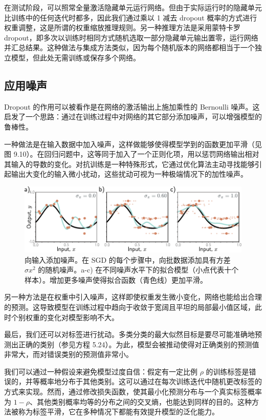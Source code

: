 \documentclass[lang=cn,newtx,10pt,scheme=chinese]{elegantbook}
\begin{document}
在测试阶段，可以照常全量激活隐藏单元运行网络。但由于实际运行时的隐藏单元比训练中的任何迭代时都多，因此我们通过乘以 1 减去 dropout 概率的方式进行权重调整，这是所谓的权重缩放推理规则。另一种推理方法是采用蒙特卡罗 dropout，即多次以训练时相同方式随机选取一部分隐藏单元输出置零，运行网络并汇总结果。这种做法与集成方法类似，因为每个随机版本的网络都相当于一个独立模型，但此处无需训练或保存多个网络。
\subsection{应用噪声}
Dropout 的作用可以被看作是在网络的激活输出上施加乘性的 Bernoulli 噪声。这启发了一个思路：通过在训练过程中对网络的其它部分添加噪声，可以增强模型的鲁棒性。

一种做法是在输入数据中加入噪声，这样做能够使得模型学到的函数更加平滑（见图 9.10）。在回归问题中，这等同于加入了一个正则化项，用以惩罚网络输出相对其输入的导数的变化。对抗训练是一种特殊形式，它通过优化算法主动寻找能够引起输出大变化的输入微小扰动，这些扰动可视为一种极端情况下的加性噪声。

\begin{figure}[ht!]
	\centering
	\includegraphics[width=0.7\linewidth]{PDFFigures/UDLChap9PDF/RegNoise.pdf}
	\caption{向输入添加噪声。在 SGD 的每个步骤中，向批数据添加具有方差 \(\sigma x^2\) 的随机噪声。a-c) 在不同噪声水平下的拟合模型（小点代表十个样本）。增加更多噪声使得拟合函数（青色线）更加平滑。}
\end{figure}


另一种方法是在权重中引入噪声，这样即使权重发生微小变化，网络也能给出合理的预测。这导致模型在训练过程中趋向于收敛于宽阔且平坦的局部最小值区域，此时个别权重的变化对模型影响不大。

最后，我们还可以对标签进行扰动。多类分类的最大似然目标是要尽可能准确地预测出正确的类别（参见方程 5.24）。为此，模型会被推动使得对正确类别的预测值非常大，而对错误类别的预测值非常小。

我们可以通过一种假设来避免模型过度自信：假定有一定比例 \(\rho\) 的训练标签是错误的，并等概率地分布于其他类别。这可以通过在每次训练迭代中随机更改标签的方式来实现。然而，通过修改损失函数，使其最小化预测分布与一个真实标签概率为 \(1 − \rho\)、其他类别概率均等的分布之间的交叉熵，也能达到同样的目的。这种方法被称为标签平滑，它在多种情况下都能有效提升模型的泛化能力。
\end{document}
